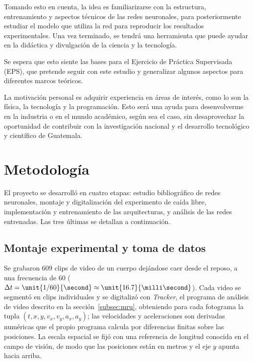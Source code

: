 \documentclass[titlepage,11pt]{article}
\begin{document}
Tomando esto en cuenta, la idea es familiarizarse con la estructura,
entrenamiento y aspectos técnicos de las redes neuronales, para posteriormente
estudiar el modelo que utiliza la red para reproducir los resultados
experimentales. Una vez terminado, se tendrá una herramienta que puede ayudar
en la didáctica y divulgación de la ciencia y la tecnología.

Se espera que esto siente las bases para el Ejercicio de Práctica Supervisada
(EPS), que pretende seguir con este estudio y generalizar algunos aspectos para
diferentes marcos teóricos.

La motivación personal es adquirir experiencia en áreas de interés,
como lo son la física, la tecnología y la programación. Esto será una ayuda
para desenvolverme en la industria o en el mundo académico, según sea el caso,
sin desaprovechar la oportunidad de contribuir con la investigación nacional y
el desarrollo tecnológico y científico de Guatemala.


\section{Metodología}
\label{sec:metodologia}

El proyecto se desarrolló en cuatro etapas: estudio bibliográfico de redes
neuronales, montaje y digitalización del experimento de caída libre,
implementación y entrenamiento de las arquitecturas, y análisis de las redes
entrenadas. Las tres últimas se detallan a continuación.

\subsection{Montaje experimental y toma de datos}
\label{sec:datos}

Se grabaron 609 clips de video de un cuerpo dejándose caer desde el
reposo, a una frecuencia de \unit{60}{\hertz} ($\Delta t = \unit{1/60}{\second}
\approx \unit{16.7}{\milli\second}$). Cada video se segmentó en clips
individuales y se digitalizó con \emph{Tracker}, el programa de análisis de video descrito
en la sección~\ref{subsec:mru}, obteniendo para cada
fotograma la tupla $(t,x,y,v_x,v_y,a_x,a_y)$; las velocidades y aceleraciones
son derivadas numéricas que el propio programa calcula por diferencias finitas
sobre las posiciones. La escala espacial se fijó con una referencia de longitud
conocida en el campo de visión, de modo que las posiciones están en metros y el
eje $y$ apunta hacia arriba.
\end{document}
